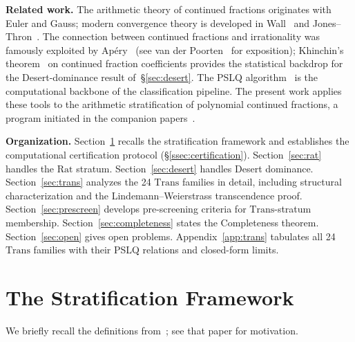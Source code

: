 \documentclass[12pt, reqno]{amsart}
\theoremstyle{definition}
\theoremstyle{remark}
\newcommand{\Rat}{\mathrm{Rat}}
\newcommand{\Trans}{\mathrm{Trans}}
\begin{document}
\textbf{Related work.}
The arithmetic theory of continued
fractions originates with Euler and Gauss; modern
convergence theory is developed in Wall~\cite{wall} and
Jones--Thron~\cite{jones_thron}. The connection between continued
fractions and irrationality was famously exploited
by Ap\'ery~\cite{apery} (see van der Poorten~\cite{vanderpoorten} for
exposition); Khinchin's theorem~\cite{khinchin_book} on continued
fraction coefficients provides the statistical
backdrop for the Desert-dominance result of~\S\ref{sec:desert}.
The PSLQ algorithm~\cite{ferguson_bailey} is the computational
backbone of the classification pipeline. The present
work applies these tools to the arithmetic
stratification of polynomial continued fractions,
a program initiated in the companion papers~\cite{contamination,logladder,psl2z,painleve}.

\textbf{Organization.}
Section~\ref{sec:framework} recalls the stratification framework and
establishes the computational certification protocol
(\S\ref{ssec:certification}).
Section~\ref{sec:rat} handles the $\Rat$ stratum.
Section~\ref{sec:desert} handles Desert dominance.
Section~\ref{sec:trans} analyzes the 24 $\Trans$ families in detail, including structural characterization
and the Lindemann--Weierstrass transcendence proof.
Section~\ref{sec:prescreen} develops
pre-screening criteria for $\Trans$-stratum membership.
Section~\ref{sec:completeness} states the
Completeness theorem.
Section~\ref{sec:open} gives open problems.
Appendix~\ref{app:trans} tabulates all 24 $\Trans$ families with their
PSLQ relations and closed-form limits.


\section{The Stratification Framework}\label{sec:framework}

We briefly recall the definitions from~\cite{logladder}; see that paper for motivation.
\end{document}
